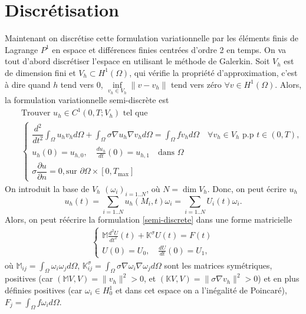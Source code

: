 \documentclass[12pt]{article}
\newcommand{\pd}[2]{ %
	\dfrac{\partial #1}{\partial #2}
}
\begin{document}
\section{Discrétisation}
Maintenant on discrétise cette formulation variationnelle par les éléments finis de Lagrange $P^1$ en espace et différences finies centrées d’ordre 2 en temps. On va tout d'abord discrétiser l'espace en utilisant le méthode de Galerkin. Soit $V_h$ est de dimension fini et $V_h \subset H^1(\Omega)$, qui vérifie la propriété d'approximation, c'est à dire quand $h$ tend vers 0, $\underset{v_h\in V_h}{\inf}\|v - v_h\|$ tend vers zéro $\forall v \in H^1(\Omega)$. Alors, la formulation variationnelle semi-discrète est
\begin{eqnarray}
\nonumber
& &\text{Trouver } u_h \in C^1(0, T; V_h) \text{ tel que}\\[2mm]
\label{semi-discrete}
& &\begin{cases}
\dfrac{d^2}{dt^2} \int_\Omega {u_h v_h d\Omega} + \int_\Omega{\sigma \nabla u_h \nabla v_h d\Omega} = \int_\Omega{f v_h d\Omega} \quad \forall v_h \in V_h \text{ p.p } t \in (0,T),\\
u_h(0) = u_{h,0}, \quad \frac{d u_h}{dt}(0) = u_{h,1} \quad \text{dans } \Omega \\
\sigma \pd{u}{n} = 0, \text{sur } \partial\Omega \times [0, T_\text{max}]
\end{cases}
\end{eqnarray}
On introduit la base de $V_h$ $(\omega_i)_{i = 1..N}$, où $N = \dim{V_h}$. Donc, on peut écrire $u_h$
\begin{equation*}
u_h(t) = \sum_{i = 1..N}{u_h(M_i, t)\omega_i} = \sum_{i = 1..N}{U_i(t)\omega_i}.
\end{equation*} 
Alors, on peut réécrire la formulation \eqref{semi-discrete} dans une forme matricielle
\begin{eqnarray}
\begin{cases} \label{matr_semi_discrete}
	\mathbb{M}\frac{d^2U}{dt^2}(t) + \mathbb{K}^\sigma U(t) = F(t)\\
	U(0) = U_0, \quad \frac{dU}{dt}(0) = U_1,
\end{cases}
\end{eqnarray}
où $\mathbb{M}_{ij} = \int_\Omega{\omega_i \omega_j d\Omega}$, $\mathbb{K}_{ij}^\sigma = \int_\Omega{\sigma\nabla\omega_i \nabla\omega_j d\Omega}$ sont les matrices symétriques, positives (car $(\mathbb{M}V,V) = \|v_h\|^2 > 0$, et $(\mathbb{K}V,V) = \|\sigma\nabla v_h\|^2 > 0$) et en plus définies positives (car $\omega_i \in H^1_0$ et dans cet espace on a l'inégalité de Poincaré), $F_j = \int_{\Omega}{f\omega_i d\Omega}$.
\end{document}
